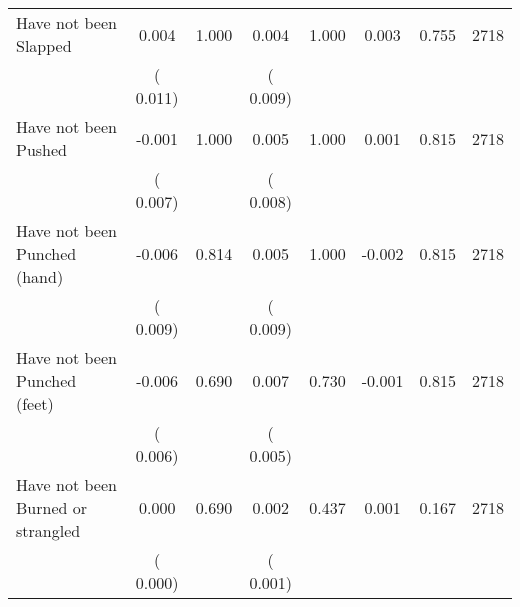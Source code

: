 \begin{tabular}{l*{7}{c}}
 Have not been Slapped       &              0.004       &        1.000  &              0.004       &        1.000  &              0.003       &              0.755 &  2718 \\ 
                       &       (       0.011)             &                               &       (       0.009)                     &                               &                                               &                                &                      \\ 

 Have not been Pushed       &             -0.001       &        1.000  &              0.005       &        1.000  &              0.001       &              0.815 &  2718 \\ 
                       &       (       0.007)             &                               &       (       0.008)                     &                               &                                               &                                &                      \\ 

 Have not been Punched (hand)       &             -0.006       &        0.814  &              0.005       &        1.000  &             -0.002       &              0.815 &  2718 \\ 
                       &       (       0.009)             &                               &       (       0.009)                     &                               &                                               &                                &                      \\ 

 Have not been Punched (feet)       &             -0.006       &        0.690  &              0.007       &        0.730  &             -0.001       &              0.815 &  2718 \\ 
                       &       (       0.006)             &                               &       (       0.005)                     &                               &                                               &                                &                      \\ 

 Have not been Burned or strangled       &              0.000       &        0.690  &              0.002       &        0.437  &              0.001       &              0.167 &  2718 \\ 
                       &       (       0.000)             &                               &       (       0.001)                     &                               &                                               &                                &                      \\ 


\end{tabular}
